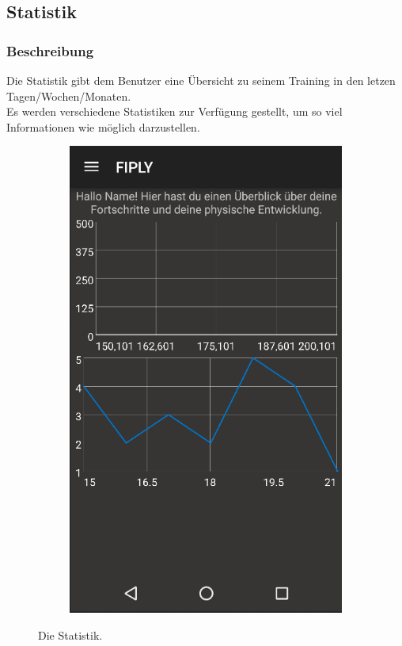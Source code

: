 \documentclass[FIPLY_base.tex]{subfiles}
\begin{document}
\subsection{Statistik}

\subsubsection{Beschreibung}
Die Statistik gibt dem Benutzer eine Übersicht zu seinem Training in den letzen Tagen/Wochen/Monaten. 
\ \\
Es werden verschiedene Statistiken zur Verfügung gestellt, um so viel Informationen wie möglich darzustellen.

\begin{figure}[H]
	\begin{subfigure}[b]{0.3\textwidth}
	\includegraphics[scale=0.50]{img/Statistik}
	\end{subfigure}
	\hfil
	\caption{Die Statistik.}
\end{figure}
\end{document}
